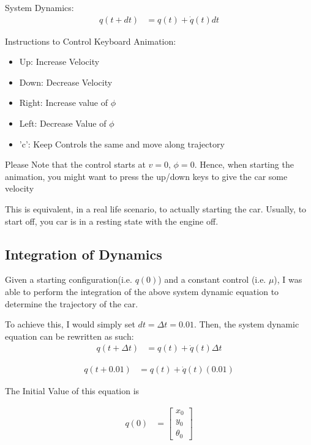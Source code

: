 \documentclass{article}
\begin{document}
System Dynamics: \newline 
\begin{align}
    q(t + dt) &= q(t) + \dot{q}(t) dt
\end{align}

Instructions to Control Keyboard Animation: \newline 

\begin{itemize}
    \item Up: Increase Velocity
    \item Down: Decrease Velocity
    \item Right: Increase value of $\phi$
    \item Left: Decrease Value of $\phi$
    \item 'c': Keep Controls the same and move along trajectory
\end{itemize}

Please Note that the control starts at $v = 0$, $\phi = 0$. Hence, when starting the animation, you might want to press the up/down keys to give the car some velocity \newline 

This is equivalent, in a real life scenario, to actually starting the car. Usually, to start off, you car is in a resting state with the engine off. \newline 

\subsection{Integration of Dynamics}
Given a starting configuration(i.e. $q(0)$) and a constant control (i.e. $\mu$), I was able to perform the integration of the above system dynamic equation to determine the trajectory of the car. 

To achieve this, I would simply set $dt = \Delta t = 0.01$. Then, the system dynamic equation can be rewritten as such: \newline 
\begin{align}
    q(t + \Delta t) &= q(t) + \dot{q}(t) \Delta t
\end{align}

\begin{align}
    q(t + 0.01) &= q(t) + \dot{q}(t) (0.01)
\end{align}

The Initial Value of this equation is 

\begin{align}
    q(0) &= \begin{bmatrix}
           x_0 \\
           y_0 \\
           \theta_0
         \end{bmatrix}
\end{align}
\end{document}
